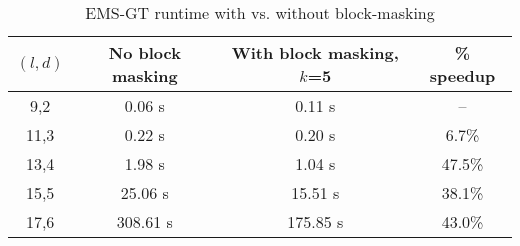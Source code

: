 \begin{table}[h] %
	\renewcommand{\arraystretch}{1.3}
	\caption{EMS-GT runtime with vs. without block-masking}
	\label{tbl:speedup_blockmasking}
	\centering
	\begin{tabular}{|c|c|c|c|}
	\hline 
	\bfseries\boldmath $(l,d)$ & \bfseries No block masking & \bfseries\boldmath With block masking, $k$=5 & \bfseries \% speedup\\
	\hline
	 9,2 &   0.06 s &    0.11 s &     --  \\
	11,3 &   0.22 s &    0.20 s &    6.7\%\\
	13,4 &   1.98 s &    1.04 s &   47.5\%\\
	15,5 &  25.06 s &   15.51 s &   38.1\%\\
	17,6 & 308.61 s &  175.85 s &   43.0\%\\
	\hline\end{tabular}
\end{table}